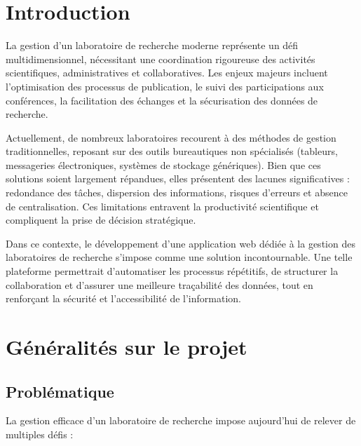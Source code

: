 \documentclass[12pt]{rapportPfe}
\begin{document}
\chapter*{Introduction}

La gestion d’un laboratoire de recherche moderne représente un défi multidimensionnel, nécessitant une coordination rigoureuse des activités scientifiques, administratives et collaboratives. Les enjeux majeurs incluent l’optimisation des processus de publication, le suivi des participations aux conférences, la facilitation des échanges et la sécurisation des données de recherche.

Actuellement, de nombreux laboratoires recourent à des méthodes de gestion traditionnelles, reposant sur des outils bureautiques non spécialisés (tableurs, messageries électroniques, systèmes de stockage génériques). Bien que ces solutions soient largement répandues, elles présentent des lacunes significatives : redondance des tâches, dispersion des informations, risques d’erreurs et absence de centralisation. Ces limitations entravent la productivité scientifique et compliquent la prise de décision stratégique.

Dans ce contexte, le développement d’une application web dédiée à la gestion des laboratoires de recherche s’impose comme une solution incontournable. Une telle plateforme permettrait d’automatiser les processus répétitifs, de structurer la collaboration et d’assurer une meilleure traçabilité des données, tout en renforçant la sécurité et l’accessibilité de l’information.


\newpage
\thispagestyle{empty}
\null
\newpage

\tabledematieres

\newpage
\listoffigures

\newpage
\listoftables


\chapter{Généralités sur le projet}

\section{Problématique}
La gestion efficace d’un laboratoire de recherche impose aujourd’hui de relever de multiples défis :
\end{document}
